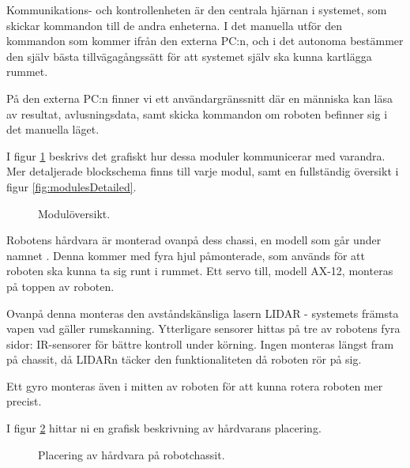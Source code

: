 Kommunikations- och kontrollenheten är den centrala hjärnan i systemet, som skickar kommandon till de andra enheterna. I det manuella utför den kommandon som kommer ifrån den externa PC:n, och i det autonoma bestämmer den själv bästa tillvägagångssätt för att systemet själv ska kunna kartlägga rummet.

På den externa PC:n finner vi ett användargränssnitt där en människa kan läsa av resultat, avlusningsdata, samt skicka kommandon om roboten befinner sig i det manuella läget.

I figur \ref{fig:modules} beskrivs det grafiskt hur dessa moduler kommunicerar med varandra. Mer detaljerade blockschema finns till varje modul, samt en fullständig översikt i figur \ref{fig:modulesDetailed}.

\begin{figure}[h!]
    \caption{Modulöversikt.}
    \label{fig:modules}
\end{figure}

\noindent
Robotens hårdvara är monterad ovanpå dess chassi, en modell som går under namnet \cite{terminator}. Denna kommer med fyra hjul påmonterade, som används för att roboten ska kunna ta sig runt i rummet. Ett servo till, modell AX-12, monteras på toppen av roboten.

Ovanpå denna monteras den avståndskänsliga lasern LIDAR - systemets främsta vapen vad gäller rumskanning. Ytterligare sensorer hittas på tre av robotens fyra sidor: IR-sensorer för bättre kontroll under körning. Ingen monteras längst fram på chassit, då LIDARn täcker den funktionaliteten då roboten rör på sig.

Ett gyro monteras även i mitten av roboten för att kunna rotera roboten mer precist.

I figur \ref{fig:placement} hittar ni en grafisk beskrivning av hårdvarans placering.

\begin{figure}[h!]
    \caption{Placering av hårdvara på robotchassit.}
    \label{fig:placement}
\end{figure}
